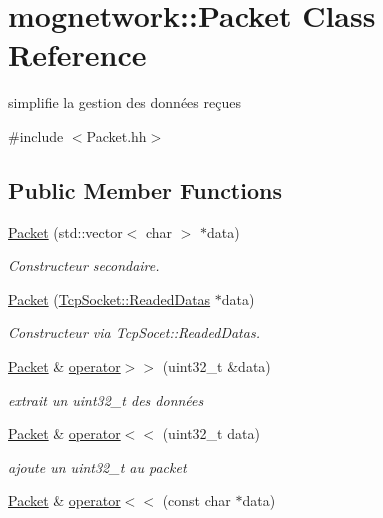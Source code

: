 \hypertarget{classmognetwork_1_1_packet}{\section{mognetwork\-:\-:Packet Class Reference}
\label{classmognetwork_1_1_packet}
}


simplifie la gestion des données reçues  




{\ttfamily \#include $<$Packet.\-hh$>$}

\subsection*{Public Member Functions}
\begin{DoxyCompactItemize}
\item 
\hyperlink{classmognetwork_1_1_packet_ad3fd2055862e5dcd730f1ba6131fd51d}{Packet} (std\-::vector$<$ char $>$ $\ast$data)
\begin{DoxyCompactList}\small\item\em Constructeur secondaire. \end{DoxyCompactList}\item 
\hyperlink{classmognetwork_1_1_packet_acdb587026d9191583a7c71398f3c2535}{Packet} (\hyperlink{structmognetwork_1_1_tcp_socket_1_1_readed_datas}{Tcp\-Socket\-::\-Readed\-Datas} $\ast$data)
\begin{DoxyCompactList}\small\item\em Constructeur via Tcp\-Socet\-::\-Readed\-Datas. \end{DoxyCompactList}\item 
\hyperlink{classmognetwork_1_1_packet}{Packet} \& \hyperlink{classmognetwork_1_1_packet_a83f88dde9175ac8b47ec9a5d28635283}{operator$>$$>$} (uint32\-\_\-t \&data)
\begin{DoxyCompactList}\small\item\em extrait un uint32\-\_\-t des données \end{DoxyCompactList}\item 
\hyperlink{classmognetwork_1_1_packet}{Packet} \& \hyperlink{classmognetwork_1_1_packet_a0ec841b42fafcd48aa4ac2d54fea6177}{operator$<$$<$} (uint32\-\_\-t data)
\begin{DoxyCompactList}\small\item\em ajoute un uint32\-\_\-t au packet \end{DoxyCompactList}\item 
\hyperlink{classmognetwork_1_1_packet}{Packet} \& \hyperlink{classmognetwork_1_1_packet_a9f73147d9c2ddab57757a27aa110de0f}{operator$<$$<$} (const char $\ast$data)

\end{DoxyCompactItemize}
